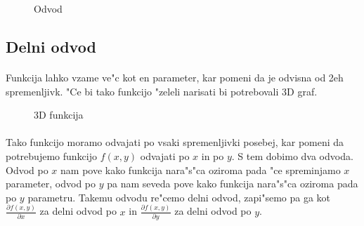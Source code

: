 \documentclass[a4paper, 12pt]{article}
\begin{document}
	
	\begin{figure}[!h]
		\centering
		\caption{Odvod}
	\end{figure}

	\subsection*{Delni odvod}
	\paragraph{}
	Funkcija lahko vzame ve"c kot en parameter, kar pomeni da je odvisna od 2eh spremenljivk. "Ce bi tako funkcijo "zeleli narisati bi potrebovali 3D graf. 
	
	\begin{figure}[h!]
		\centering
		\caption{3D funkcija}
	\end{figure}
	
	\paragraph{}
	Tako funkcijo moramo odvajati po vsaki spremenljivki posebej, kar pomeni da potrebujemo funkcijo $f(x,y)$ odvajati po $x$ in po $y$. S tem dobimo dva odvoda. Odvod po $x$ nam pove kako funkcija nara"s"ca oziroma pada "ce spreminjamo $x$ parameter, odvod po $y$ pa nam seveda pove kako funkcija nara"s"ca oziroma pada po $y$ parametru. Takemu odvodu re"cemo delni odvod, zapi"semo pa ga kot $\frac{\partial f(x,y)}{\partial x}$ za delni odvod po $x$ in $\frac{\partial f(x,y)}{\partial y}$ za delni odvod po $y$.
	
\end{document}
